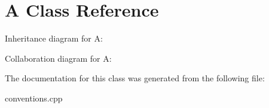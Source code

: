 \hypertarget{classA}{}\section{A Class Reference}
\label{classA}


Inheritance diagram for A\+:


Collaboration diagram for A\+:


The documentation for this class was generated from the following file\+:\begin{DoxyCompactItemize}
\item 
conventions.\+cpp\end{DoxyCompactItemize}
